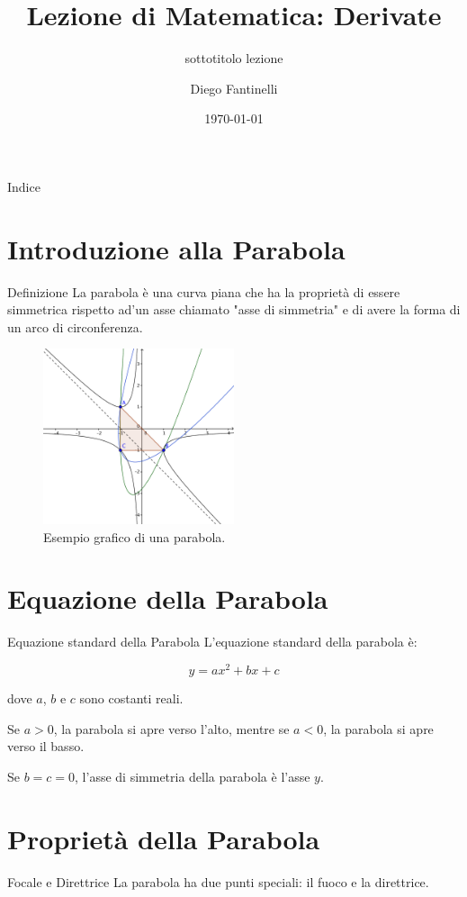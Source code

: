 \documentclass[aspectratio=169]{beamer}
\title[Titolo in basso a destra]{Lezione di Matematica: Derivate}
\subtitle{sottotitolo lezione}
\date{\today}
\author{Diego Fantinelli}
\institute{Matematica per il Liceo}
\begin{document}
\begin{frame}
  \maketitle
\end{frame}

\begin{frame}{Indice}
  \tableofcontents
\end{frame}

\section{Introduzione alla Parabola}

\begin{frame}{Definizione}
  La parabola è una curva piana che ha la proprietà di essere simmetrica rispetto ad'un asse chiamato "asse di simmetria" e di avere la forma di un arco di circonferenza.
  
  \begin{figure}[htbp]
    \centering
    \includegraphics[width=0.5\textwidth]{parabola.png}
    \caption{Esempio grafico di una parabola.}
    \label{fig:parabola}
  \end{figure}  
\end{frame}

\section{Equazione della Parabola}

\begin{frame}{Equazione standard della Parabola}
  L'equazione standard della parabola è:
  
  $$y = ax^2 + bx + c$$
  
  dove $a$, $b$ e $c$ sono costanti reali.
  
  Se $a > 0$, la parabola si apre verso l'alto, mentre se $a < 0$, la parabola si apre verso il basso.
  
  Se $b = c = 0$, l'asse di simmetria della parabola è l'asse $y$.
\end{frame}

\section{Proprietà della Parabola}

\begin{frame}{Focale e Direttrice}
  La parabola ha due punti speciali: il fuoco e la direttrice.
\end{frame}
\end{document}
